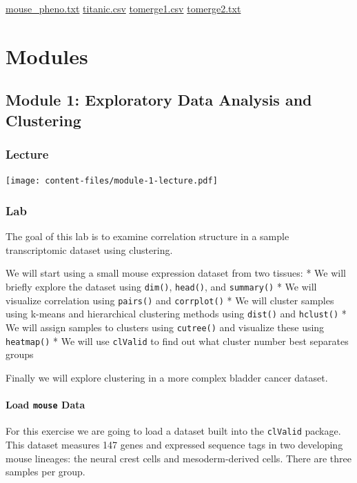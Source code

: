 \documentclass[
]{book}
\begin{document}
\href{datasets/mouse_pheno.txt}{mouse\_pheno.txt}
\href{datasets/titanic.csv}{titanic.csv}
\href{datasets/tomerge1.csv}{tomerge1.csv}
\href{datasets/tomerge2.txt}{tomerge2.txt}

\part{Modules}\label{part-modules}

\chapter{Module 1: Exploratory Data Analysis and Clustering}\label{module-1-exploratory-data-analysis-and-clustering}

\section{Lecture}\label{lecture}

\texttt{[image: content-files/module-1-lecture.pdf]}\\

\section{Lab}\label{lab}

The goal of this lab is to examine correlation structure in a sample transcriptomic dataset using clustering.

We will start using a small mouse expression dataset from two tissues:
* We will briefly explore the dataset using \texttt{dim()}, \texttt{head()}, and \texttt{summary()}
* We will visualize correlation using \texttt{pairs()} and \texttt{corrplot()}
* We will cluster samples using k-means and hierarchical clustering methods using \texttt{dist()} and \texttt{hclust()}
* We will assign samples to clusters using \texttt{cutree()} and visualize these using \texttt{heatmap()}
* We will use \texttt{clValid} to find out what cluster number best separates groups

Finally we will explore clustering in a more complex bladder cancer dataset.

\subsection{\texorpdfstring{Load \texttt{mouse} Data}{Load mouse Data}}\label{load-mouse-data}

For this exercise we are going to load a dataset built into the \texttt{clValid} package.
This dataset measures 147 genes and expressed sequence tags in two developing mouse lineages: the neural crest cells and mesoderm-derived cells. There are three samples per group.
\end{document}
